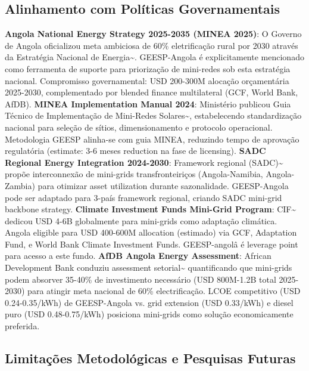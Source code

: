 \documentclass[12pt, a4paper]{article}
\begin{document}
\subsection{Alinhamento com Políticas Governamentais}
\textbf{Angola National Energy Strategy 2025-2035 (MINEA 2025)}: O Governo de Angola oficializou meta ambiciosa de 60\% eletrificação rural por 2030 através da Estratégia Nacional de Energia\textasciitilde{}\citep{Angola2025EnergyStrategy}. GEESP-Angola é explicitamente mencionado como ferramenta de suporte para priorização de mini-redes sob esta estratégia nacional. Compromisso governamental: USD 200-300M alocação orçamentária 2025-2030, complementado por blended finance multilateral (GCF, World Bank, AfDB).
\textbf{MINEA Implementation Manual 2024}: Ministério publicou Guia Técnico de Implementação de Mini-Redes Solares\textasciitilde{}\citep{MINEA2024MiniGridManual}, estabelecendo standardização nacional para seleção de sítios, dimensionamento e protocolo operacional. Metodologia GEESP alinha-se com guia MINEA, reduzindo tempo de aprovação regulatória (estimate: 3-6 meses reduction na fase de licensing).
\textbf{SADC Regional Energy Integration 2024-2030}: Framework regional (SADC)\textasciitilde{}\citep{SADC2024EnergyIntegration} propõe interconnexão de mini-grids transfronteiriços (Angola-Namibia, Angola-Zambia) para otimizar asset utilization durante sazonalidade. GEESP-Angola pode ser adaptado para 3-país framework regional, criando SADC mini-grid backbone strategy.
\textbf{Climate Investment Funds Mini-Grid Program}: CIF\textasciitilde{}\citep{CIF2024MiniGridBrief} dedicou USD 4-6B globalmente para mini-grids como adaptação climática. Angola eligible para USD 400-600M allocation (estimado) via GCF, Adaptation Fund, e World Bank Climate Investment Funds. GEESP-angolâ é leverage point para acesso a este fundo.
\textbf{AfDB Angola Energy Assessment}: African Development Bank conduziu assessment setorial\textasciitilde{}\citep{AfDB2024AngolaSector} quantificando que mini-grids podem absorver 35-40\% de investimento necessário (USD 800M-1.2B total 2025-2030) para atingir meta nacional de 60\% electrificação. LCOE competitivo (USD 0.24-0.35/kWh) de GEESP-Angola vs. grid extension (USD 0.33/kWh) e diesel puro (USD 0.48-0.75/kWh) posiciona mini-grids como solução economicamente preferida.

\subsection{Limitações Metodológicas e Pesquisas Futuras}
\end{document}
